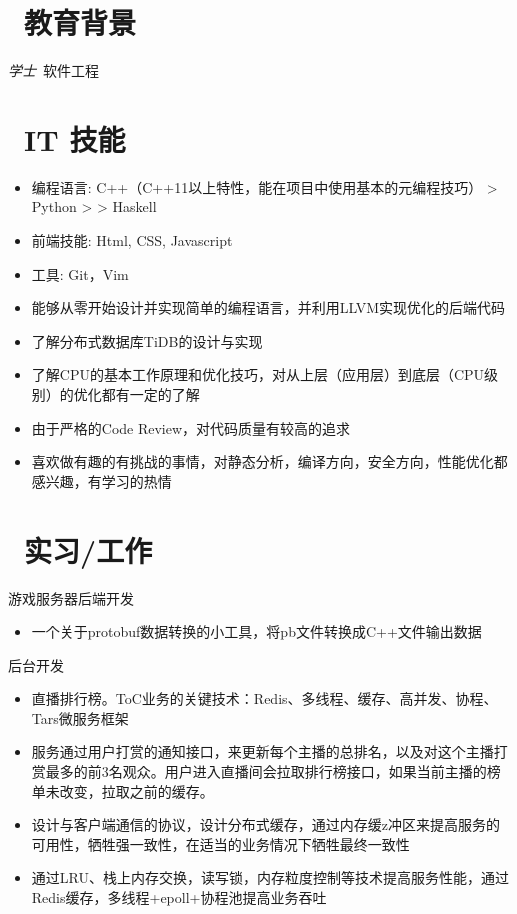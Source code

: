 \documentclass{resume}
\begin{document}


 
\section{\faGraduationCap\  教育背景}
\textit{学士}\ 软件工程

\section{\faCogs\ IT 技能}
\begin{itemize}[parsep=0.5ex]
  \item 编程语言: C++（C++11以上特性，能在项目中使用基本的元编程技巧）  >  Python  > >  Haskell
  \item 前端技能: Html, CSS, Javascript
  \item 工具: Git，Vim
  \item 能够从零开始设计并实现简单的编程语言，并利用LLVM实现优化的后端代码
  \item 了解分布式数据库TiDB的设计与实现
  \item 了解CPU的基本工作原理和优化技巧，对从上层（应用层）到底层（CPU级别）的优化都有一定的了解
  \item 由于严格的Code Review，对代码质量有较高的追求
  \item 喜欢做有趣的有挑战的事情，对静态分析，编译方向，安全方向，性能优化都感兴趣，有学习的热情
\end{itemize}

\section{\faUsers\ 实习/工作}
\role{实习}{游戏预研组员工}
游戏服务器后端开发
\begin{itemize}
  \item 一个关于protobuf数据转换的小工具，将pb文件转换成C++文件输出数据
\end{itemize}

后台开发
\begin{itemize}
  \item 直播排行榜。ToC业务的关键技术：Redis、多线程、缓存、高并发、协程、Tars微服务框架
  \item 服务通过用户打赏的通知接口，来更新每个主播的总排名，以及对这个主播打赏最多的前3名观众。用户进入直播间会拉取排行榜接口，如果当前主播的榜单未改变，拉取之前的缓存。
  \item 设计与客户端通信的协议，设计分布式缓存，通过内存缓z冲区来提高服务的可用性，牺牲强一致性，在适当的业务情况下牺牲最终一致性
  \item 通过LRU、栈上内存交换，读写锁，内存粒度控制等技术提高服务性能，通过Redis缓存，多线程+epoll+协程池提高业务吞吐
\end{itemize}
\end{document}

